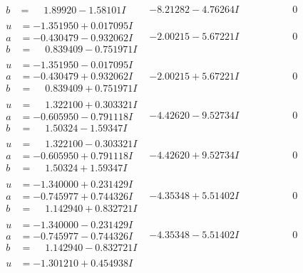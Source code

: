 \documentclass[1p]{elsarticle_modified}
\theoremstyle{definition}
\begin{document}
$$\begin{array}{c|c|c}
\begin{aligned}
b &= \phantom{-}1.89920 - 1.58101 I\end{aligned}
 & -8.21282 - 4.76264 I & \phantom{-0.000000 } 0 \\ \hline\begin{aligned}
u &= -1.351950 + 0.017095 I \\
a &= -0.430479 - 0.932062 I \\
b &= \phantom{-}0.839409 - 0.751971 I\end{aligned}
 & -2.00215 - 5.67221 I & \phantom{-0.000000 } 0 \\ \hline\begin{aligned}
u &= -1.351950 - 0.017095 I \\
a &= -0.430479 + 0.932062 I \\
b &= \phantom{-}0.839409 + 0.751971 I\end{aligned}
 & -2.00215 + 5.67221 I & \phantom{-0.000000 } 0 \\ \hline\begin{aligned}
u &= \phantom{-}1.322100 + 0.303321 I \\
a &= -0.605950 - 0.791118 I \\
b &= \phantom{-}1.50324 - 1.59347 I\end{aligned}
 & -4.42620 - 9.52734 I & \phantom{-0.000000 } 0 \\ \hline\begin{aligned}
u &= \phantom{-}1.322100 - 0.303321 I \\
a &= -0.605950 + 0.791118 I \\
b &= \phantom{-}1.50324 + 1.59347 I\end{aligned}
 & -4.42620 + 9.52734 I & \phantom{-0.000000 } 0 \\ \hline\begin{aligned}
u &= -1.340000 + 0.231429 I \\
a &= -0.745977 + 0.744326 I \\
b &= \phantom{-}1.142940 + 0.832721 I\end{aligned}
 & -4.35348 + 5.51402 I & \phantom{-0.000000 } 0 \\ \hline\begin{aligned}
u &= -1.340000 - 0.231429 I \\
a &= -0.745977 - 0.744326 I \\
b &= \phantom{-}1.142940 - 0.832721 I\end{aligned}
 & -4.35348 - 5.51402 I & \phantom{-0.000000 } 0 \\ \hline\begin{aligned}
u &= -1.301210 + 0.454938 I \\

\end{aligned}
\end{array}$$
\end{document}
